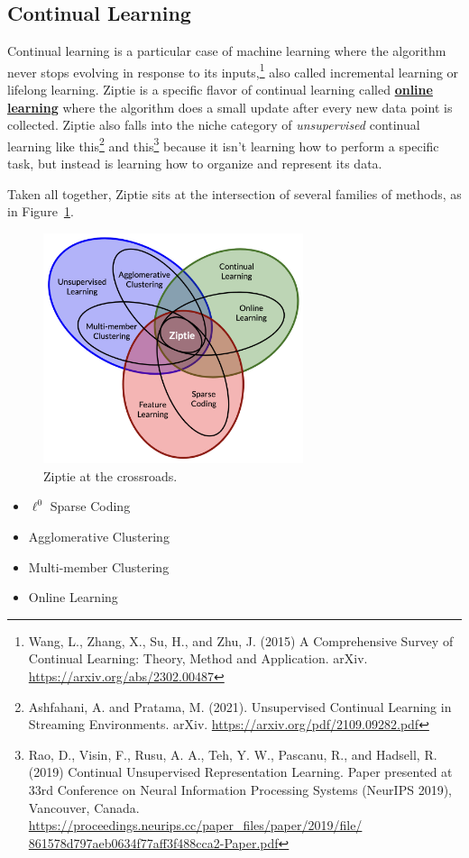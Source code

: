 \subsection{Continual Learning}
\label{subsec:continual}

Continual learning is a particular case of machine learning where the
algorithm never stops evolving in response to its inputs,\footnote{
Wang, L., Zhang, X., Su, H., and Zhu, J. (2015)
A Comprehensive Survey of Continual Learning: Theory, Method and Application.
arXiv.
\href{https://arxiv.org/abs/2302.00487}{https://arxiv.org/abs/2302.00487}
}
also called incremental learning or lifelong learning.
Ziptie is a specific flavor of continual learning called
\textbf{\href{https://en.wikipedia.org/wiki/Online_machine_learning}{online learning}}
where the algorithm does a small update after every new data point is collected.
Ziptie also falls into the niche category of \textit{unsupervised}
continual learning like this\footnote{
Ashfahani, A. and Pratama, M. (2021).
Unsupervised Continual Learning in Streaming Environments. arXiv.
\href{https://arxiv.org/pdf/2109.09282.pdf}{https://arxiv.org/pdf/2109.09282.pdf}
}
and this\footnote{
Rao, D., Visin, F., Rusu, A. A., Teh, Y. W., Pascanu, R., and Hadsell, R.
(2019) Continual Unsupervised Representation Learning.
Paper presented at 33rd Conference on Neural Information Processing Systems
(NeurIPS 2019), Vancouver, Canada.
\href{https://proceedings.neurips.cc/paper_files/paper/2019/file/861578d797aeb0634f77aff3f488cca2-Paper.pdf}
{https://proceedings.neurips.cc/paper\_files/paper/2019/file/ 861578d797aeb0634f77aff3f488cca2-Paper.pdf}
}
because it isn't learning how to perform a specific task, but instead is
learning how to organize and represent its data. 


Taken all together, Ziptie sits at the intersection 
of several families of methods, as in Figure~\ref{fig:venn}.

\begin{figure}[ht]
\vskip 0.2in
\begin{center}
\centerline{\includegraphics[width=3.0in]{images/ziptie_venn.png}}
\caption{Ziptie at the crossroads.}
\label{fig:venn}
\end{center}
\vskip -0.2in
\end{figure}

\begin{itemize}
\item{$\ell^0$ Sparse Coding}
\item{Agglomerative Clustering}
\item{Multi-member Clustering}
\item{Online Learning}
\end{itemize}
